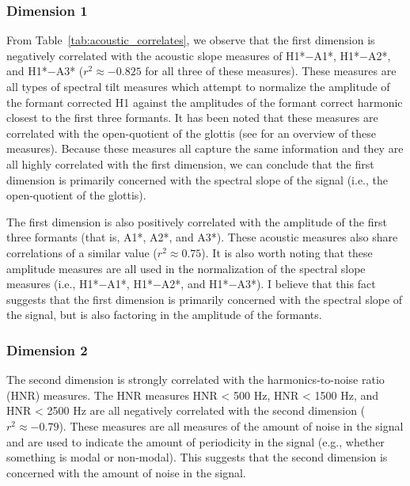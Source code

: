 \subsubsection{Dimension 1} \label{sec:acousticlandscape:dim1}
From Table~\ref{tab:acoustic_correlates}, we observe that the first dimension is negatively correlated with the acoustic slope measures of H1*$-$A1*, H1*$-$A2*, and H1*$-$A3* ($r^{2} \approx -0.825$ for all three of these measures). These measures are all types of spectral tilt measures which attempt to normalize the amplitude of the formant corrected H1 against the amplitudes of the formant correct harmonic closest to the first three formants. It has been noted that these measures are correlated with the open-quotient of the glottis (see \cite{garellekPhoneticsVoice2019,garellekTheoreticalAchievementsPhonetics2022} for an overview of these measures). Because these measures all capture the same information and they are all highly correlated with the first dimension, we can conclude that the first dimension is primarily concerned with the spectral slope of the signal (i.e., the open-quotient of the glottis). 

The first dimension is also positively correlated with the amplitude of the first three formants (that is, A1*, A2*, and A3*). These acoustic measures also share correlations of a similar value ($r^{2} \approx 0.75$). It is also worth noting that these amplitude measures are all used in the normalization of the spectral slope measures (i.e., H1*$-$A1*, H1*$-$A2*, and H1*$-$A3*). I believe that this fact suggests that the first dimension is primarily concerned with the spectral slope of the signal, but is also factoring in the amplitude of the formants.

\subsubsection{Dimension 2} \label{sec:acousticlandscape:dim2}
The second dimension is strongly correlated with the harmonics-to-noise ratio (HNR) measures. The HNR measures HNR < 500 Hz, HNR < 1500 Hz, and HNR < 2500 Hz are all negatively correlated with the second dimension ($r^{2} \approx -0.79$). These measures are all measures of the amount of noise in the signal and are used to indicate the amount of periodicity in the signal (e.g., whether something is modal or non-modal). This suggests that the second dimension is concerned with the amount of noise in the signal.


